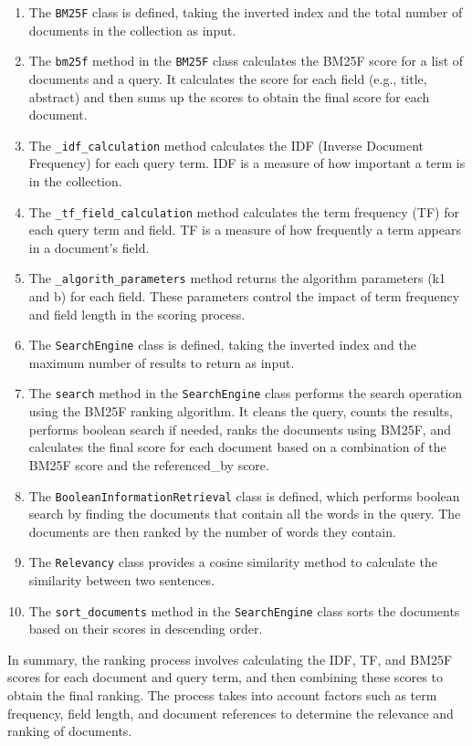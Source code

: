 \documentclass{article}
\begin{document}
\begin{enumerate}
    \item The \texttt{BM25F} class is defined, taking the inverted index and the total number of documents in the collection as input.
    \item The \texttt{bm25f} method in the \texttt{BM25F} class calculates the BM25F score for a list of documents and a query. It calculates the score for each field (e.g., title, abstract) and then sums up the scores to obtain the final score for each document.
    \item The \texttt{\_idf\_calculation} method calculates the IDF (Inverse Document Frequency) for each query term. IDF is a measure of how important a term is in the collection.
    \item The \texttt{\_tf\_field\_calculation} method calculates the term frequency (TF) for each query term and field. TF is a measure of how frequently a term appears in a document's field.
    \item The \texttt{\_algorith\_parameters} method returns the algorithm parameters (k1 and b) for each field. These parameters control the impact of term frequency and field length in the scoring process.
    \item The \texttt{SearchEngine} class is defined, taking the inverted index and the maximum number of results to return as input.
    \item The \texttt{search} method in the \texttt{SearchEngine} class performs the search operation using the BM25F ranking algorithm. It cleans the query, counts the results, performs boolean search if needed, ranks the documents using BM25F, and calculates the final score for each document based on a combination of the BM25F score and the referenced\_by score.
    \item The \texttt{BooleanInformationRetrieval} class is defined, which performs boolean search by finding the documents that contain all the words in the query. The documents are then ranked by the number of words they contain.
    \item The \texttt{Relevancy} class provides a cosine similarity method to calculate the similarity between two sentences.
    \item The \texttt{sort\_documents} method in the \texttt{SearchEngine} class sorts the documents based on their scores in descending order.
\end{enumerate}

In summary, the ranking process involves calculating the IDF, TF, and BM25F scores for each document and query term, and then combining these scores to obtain the final ranking. The process takes into account factors such as term frequency, field length, and document references to determine the relevance and ranking of documents.
\end{document}
